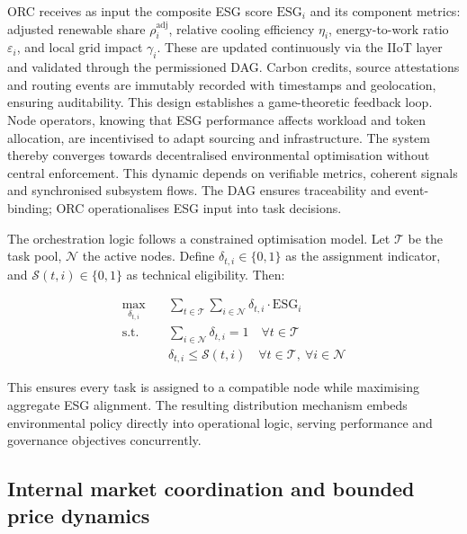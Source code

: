 \documentclass[oneside,10pt]{swissi}
\begin{document}
ORC receives as input the composite ESG score \( \text{ESG}_i \) and its component metrics: adjusted renewable share \( \rho_i^{\text{adj}} \), relative cooling efficiency \( \eta_i \), energy-to-work ratio \( \varepsilon_i \), and local grid impact \( \gamma_i \). These are updated continuously via the IIoT layer and validated through the permissioned DAG. Carbon credits, source attestations and routing events are immutably recorded with timestamps and geolocation, ensuring auditability. This design establishes a game-theoretic feedback loop. Node operators, knowing that ESG performance affects workload and token allocation, are incentivised to adapt sourcing and infrastructure. The system thereby converges towards decentralised environmental optimisation without central enforcement. This dynamic depends on verifiable metrics, coherent signals and synchronised subsystem flows. The DAG ensures traceability and event-binding; ORC operationalises ESG input into task decisions.

The orchestration logic follows a constrained optimisation model. Let \( \mathcal{T} \) be the task pool, \( \mathcal{N} \) the active nodes. Define \( \delta_{t,i} \in \{0,1\} \) as the assignment indicator, and \( \mathcal{S}(t,i) \in \{0,1\} \) as technical eligibility. Then:

\begin{align}
\max_{\delta_{t,i}} \quad & \sum_{t \in \mathcal{T}} \sum_{i \in \mathcal{N}} \delta_{t,i} \cdot \text{ESG}_i \\
\text{s.t.} \quad & \sum_{i \in \mathcal{N}} \delta_{t,i} = 1 \quad \forall t \in \mathcal{T} \\
& \delta_{t,i} \le \mathcal{S}(t,i) \quad \forall t \in \mathcal{T},\ \forall i \in \mathcal{N}
\end{align}

This ensures every task is assigned to a compatible node while maximising aggregate ESG alignment. The resulting distribution mechanism embeds environmental policy directly into operational logic, serving performance and governance objectives concurrently.\\

\subsection{Internal market coordination and bounded price dynamics}
\end{document}
